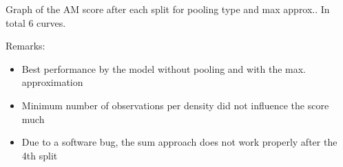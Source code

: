 \documentclass[11pt, a4paper, landscape]{article}
\begin{document}
\NewPage{}
\vfill
\begin{center}
  Graph of the AM score after each split for pooling type and max approx.. In total 6 curves.
\end{center}

Remarks:
\begin{itemize}
  \item Best performance by the model without pooling and with the max. approximation
  \item Minimum number of observations per density did not influence the score much
  \item Due to a software bug, the sum approach does not work properly after the 4th split
\end{itemize}
\vfill

\NewPage{}
\vfill
\vfill

\NewPage{}
\vfill
\vfill

\NewPage{}
\vfill
\vfill


\FinalPage
\end{document}
